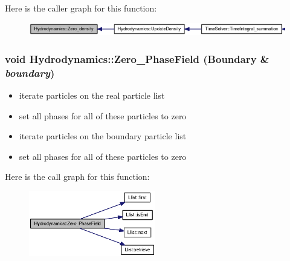 Here is the caller graph for this function:\nopagebreak
\begin{figure}[H]
\begin{center}
\leavevmode
\includegraphics[width=333pt]{classHydrodynamics_13810b3b4110a2b931bf7426af2f9bcf_icgraph}
\end{center}
\end{figure}
\hypertarget{classHydrodynamics_dedab91b9a62eb7e26931cbbe73f79cc}{
\subsubsection[{Zero\_\-PhaseField}]{\setlength{\rightskip}{0pt plus 5cm}void Hydrodynamics::Zero\_\-PhaseField ({\bf Boundary} \& {\em boundary})}}
\label{classHydrodynamics_dedab91b9a62eb7e26931cbbe73f79cc}




\begin{itemize}
\item iterate particles on the real particle list\end{itemize}


\begin{itemize}
\item set all phases for all of these particles to zero\end{itemize}


\begin{itemize}
\item iterate particles on the boundary particle list\end{itemize}


\begin{itemize}
\item set all phases for all of these particles to zero \end{itemize}


Here is the call graph for this function:\nopagebreak
\begin{figure}[H]
\begin{center}
\leavevmode
\includegraphics[width=157pt]{classHydrodynamics_dedab91b9a62eb7e26931cbbe73f79cc_cgraph}
\end{center}
\end{figure}


